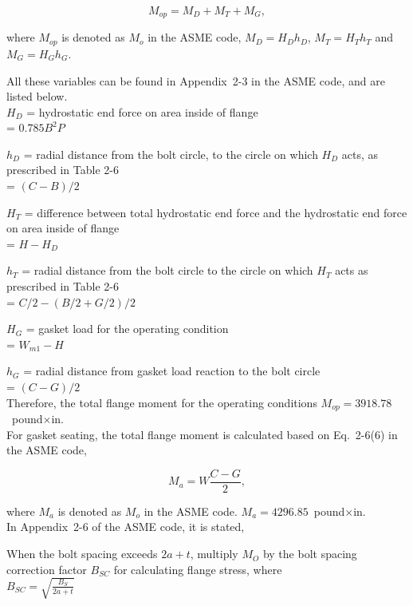 \begin{equation}
    M_{op} = M_D+M_T+M_G,
\end{equation}

where $M_{op}$ is denoted as $M_o$ in the ASME code,
$M_D = H_Dh_D$, $M_T = H_Th_T$ and $M_G = H_Gh_G$.

All these variables can be found in Appendix~2-3 in the ASME code,
and are listed below.\\

$H_D$ = hydrostatic end force on area inside of flange \\
= $0.785B^2P$

$h_D$ = radial distance from the bolt circle, to the circle on which 
$H_D$ acts, as prescribed in Table 2-6 \\
= $(C-B)/2$

$H_T$ = difference between total hydrostatic end force and the hydrostatic 
end force on area inside of flange \\
= $H - H_D$

$h_T$ = radial distance from the bolt circle to the circle on which 
$H_T$ acts as prescribed in Table 2-6 \\ 
= $C/2 - (B/2+G/2)/2$

$H_G$ = gasket load for the operating condition \\
= $W_{m1} - H$

$h_G$ = radial distance from gasket load reaction to the bolt circle \\
= $(C-G)/2$ \\

Therefore, the total flange moment for the operating conditions
$M_{op} = 3918.78$~pound$\times$in.\\

For gasket seating, the total flange moment is calculated based on
Eq.~2-6(6) in the ASME code,

\begin{equation}
    M_a = W\frac{C-G}{2},
\end{equation}

where $M_a$ is denoted as $M_o$ in the ASME code.
$M_a = 4296.85$~pound$\times$in.\\

In Appendix~2-6 of the ASME code, it is stated,

\begin{displayquote}
    When the bolt spacing exceeds $2a + t$, multiply $M_O$ by the bolt spacing 
    correction factor $B_{SC}$ for calculating flange stress, where \\

    $B_{SC} = \sqrt{\frac{B_S}{2a+t}}$
\end{displayquote}

